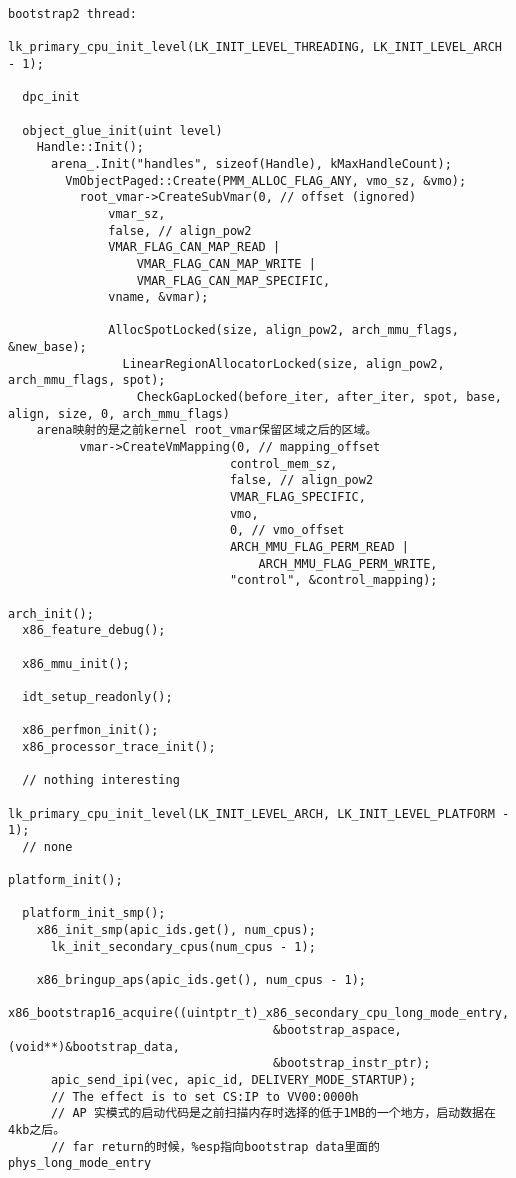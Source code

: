 \begin{verbatim}
bootstrap2 thread:

lk_primary_cpu_init_level(LK_INIT_LEVEL_THREADING, LK_INIT_LEVEL_ARCH - 1);

  dpc_init

  object_glue_init(uint level)
    Handle::Init();
      arena_.Init("handles", sizeof(Handle), kMaxHandleCount);
        VmObjectPaged::Create(PMM_ALLOC_FLAG_ANY, vmo_sz, &vmo);
          root_vmar->CreateSubVmar(0, // offset (ignored)
              vmar_sz,
              false, // align_pow2
              VMAR_FLAG_CAN_MAP_READ |
                  VMAR_FLAG_CAN_MAP_WRITE |
                  VMAR_FLAG_CAN_MAP_SPECIFIC,
              vname, &vmar);

              AllocSpotLocked(size, align_pow2, arch_mmu_flags, &new_base);
                LinearRegionAllocatorLocked(size, align_pow2, arch_mmu_flags, spot);
                  CheckGapLocked(before_iter, after_iter, spot, base, align, size, 0, arch_mmu_flags)
    arena映射的是之前kernel root_vmar保留区域之后的区域。
          vmar->CreateVmMapping(0, // mapping_offset
                               control_mem_sz,
                               false, // align_pow2
                               VMAR_FLAG_SPECIFIC,
                               vmo,
                               0, // vmo_offset
                               ARCH_MMU_FLAG_PERM_READ |
                                   ARCH_MMU_FLAG_PERM_WRITE,
                               "control", &control_mapping);

arch_init();
  x86_feature_debug();

  x86_mmu_init();

  idt_setup_readonly();

  x86_perfmon_init();
  x86_processor_trace_init();

  // nothing interesting

lk_primary_cpu_init_level(LK_INIT_LEVEL_ARCH, LK_INIT_LEVEL_PLATFORM - 1);
  // none

platform_init();

  platform_init_smp();
    x86_init_smp(apic_ids.get(), num_cpus);
      lk_init_secondary_cpus(num_cpus - 1);

    x86_bringup_aps(apic_ids.get(), num_cpus - 1);
      x86_bootstrap16_acquire((uintptr_t)_x86_secondary_cpu_long_mode_entry,
                                     &bootstrap_aspace, (void**)&bootstrap_data,
                                     &bootstrap_instr_ptr);
      apic_send_ipi(vec, apic_id, DELIVERY_MODE_STARTUP);
      // The effect is to set CS:IP to VV00:0000h
      // AP 实模式的启动代码是之前扫描内存时选择的低于1MB的一个地方，启动数据在4kb之后。
      // far return的时候，%esp指向bootstrap data里面的phys_long_mode_entry




\end{verbatim}
